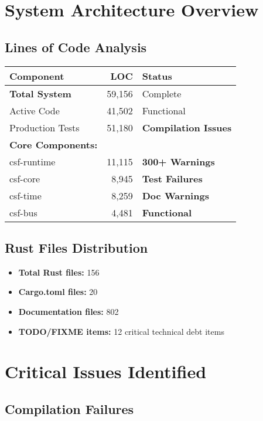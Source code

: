 \documentclass[11pt,a4paper]{article}
\newcommand{\critical}[1]{\textcolor{criticalred}{\textbf{#1}}}
\newcommand{\warning}[1]{\textcolor{warningorange}{\textbf{#1}}}
\newcommand{\success}[1]{\textcolor{successgreen}{\textbf{#1}}}
\begin{document}
\section{System Architecture Overview}

\subsection{Lines of Code Analysis}
\begin{center}
\begin{tabular}{|l|r|l|}
\hline
\textbf{Component} & \textbf{LOC} & \textbf{Status} \\
\hline
\textbf{Total System} & 59,156 & Complete \\
Active Code & 41,502 & Functional \\
Production Tests & 51,180 & \critical{Compilation Issues} \\
\hline
\textbf{Core Components:} & & \\
csf-runtime & 11,115 & \warning{300+ Warnings} \\
csf-core & 8,945 & \warning{Test Failures} \\
csf-time & 8,259 & \warning{Doc Warnings} \\
csf-bus & 4,481 & \success{Functional} \\
\hline
\end{tabular}
\end{center}

\subsection{Rust Files Distribution}
\begin{itemize}
    \item \textbf{Total Rust files:} 156
    \item \textbf{Cargo.toml files:} 20
    \item \textbf{Documentation files:} 802
    \item \textbf{TODO/FIXME items:} 12 critical technical debt items
\end{itemize}

\section{Critical Issues Identified}

\subsection{Compilation Failures}
\end{document}
